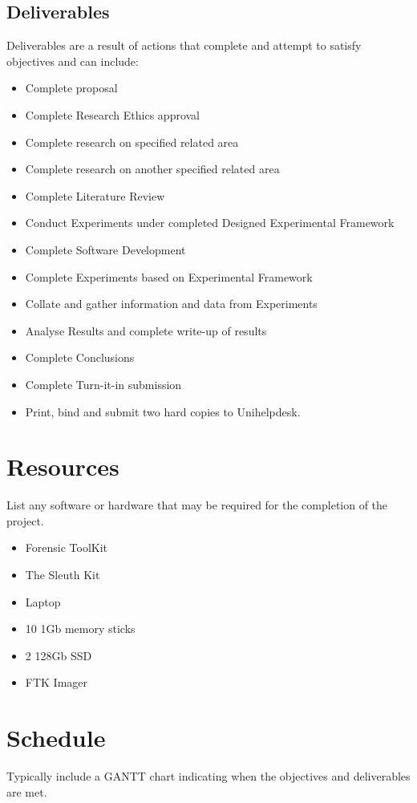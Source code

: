\subsection{Deliverables}
Deliverables are a result of actions that complete and attempt to satisfy objectives and can include:
\begin{itemize}
\item Complete proposal
\item Complete Research Ethics approval
\item Complete research on specified related area
\item Complete research on another specified related area
\item Complete Literature Review
\item Conduct Experiments under completed Designed Experimental Framework
\item Complete Software Development
\item Complete Experiments based on Experimental Framework
\item Collate and gather information and data from Experiments
\item Analyse Results and complete write-up of results
\item Complete Conclusions
\item Complete Turn-it-in submission
\item Print, bind and submit two hard copies to Unihelpdesk.
\end{itemize}

\section{Resources}
List any software or hardware that may be required for the completion of the project.

\begin{itemize}
\item Forensic ToolKit
\item The Sleuth Kit
\item Laptop
\item 10 1Gb memory sticks
\item 2 128Gb SSD
\item FTK Imager
\end{itemize}

\section{Schedule}
Typically include a GANTT chart indicating when the objectives and deliverables are met.

